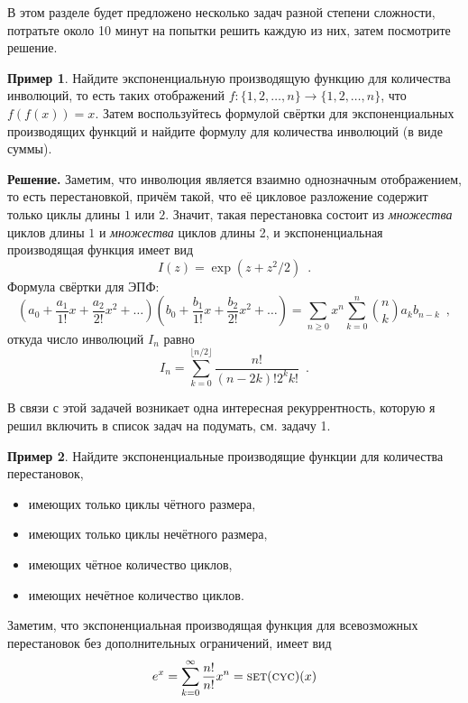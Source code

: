 \documentclass{article}
\theoremstyle{definition}
\newtheorem{example}{Пример}
\begin{document}
В этом разделе будет предложено несколько задач разной степени сложности, 
потратьте около 10 минут на попытки решить каждую из них, затем посмотрите 
решение.


\begin{example}   Найдите экспоненциальную производящую функцию для количества 
инволюций, то есть таких отображений \( f \colon \{ 1, 2, \ldots, n \} \to \{ 
1, 2, \ldots, n \} \), что \( f(f(x)) = x \). Затем воспользуйтесь формулой 
свёртки для экспоненциальных производящих функций и найдите формулу для 
количества инволюций (в виде суммы).
\end{example}

\textbf{Решение.} Заметим, что инволюция является взаимно однозначным 
отображением, то есть перестановкой, причём такой, что её цикловое разложение 
содержит только циклы длины \( 1 \) или \( 2 \). Значит, такая перестановка 
состоит из \textit{множества} циклов длины \( 1 \) и \textit{множества} циклов 
длины 2, и экспоненциальная производящая функция имеет вид
\[
	I(z) = \exp \left(
		z + z^2/2
	\right) \enspace .
\]
Формула свёртки для ЭПФ:
\[
	\left(a_0 + \dfrac{a_1}{1!}x + \dfrac{a_2}{2!}x^2 + \ldots\right)
	\left(b_0 + \dfrac{b_1}{1!}x + \dfrac{b_2}{2!}x^2 + \ldots\right)	
= \sum_{n \geq 0} x^n \sum_{k = 0}^{n}{n \choose k} a_{k} b_{n-k} \enspace ,
\]
откуда число инволюций \( I_n \) равно
\[
	I_n = \sum_{k=0}^{\lfloor n/2 \rfloor}\dfrac{n!}{(n-2k)!2^k k!} \enspace .
\]

В связи с этой задачей возникает одна интересная рекуррентность, которую я решил
включить в список задач на подумать, см. задачу 1.

\begin{example}   Найдите экспоненциальные производящие функции для количества 
перестановок,
\begin{itemize}
	\item имеющих только циклы чётного размера,
	\item имеющих только циклы нечётного размера,
	\item имеющих чётное количество циклов,
	\item имеющих нечётное количество циклов.
\end{itemize}     
\end{example}

Заметим, что экспоненциальная производящая функция для всевозможных перестановок
без дополнительных ограничений, имеет вид
\begin{equation*}
    e^x = \sum_{k=0}^{\infty} \dfrac{n!}{n!}x^n =
\text{\textsc{set}}(\text{\textsc{cyc}})(x)
\end{equation*}
\end{document}
